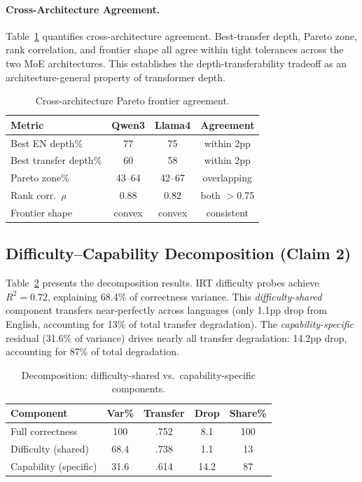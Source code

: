 \documentclass[11pt,a4paper]{article}
\begin{document}
\paragraph{Cross-Architecture Agreement.}
Table~\ref{tab:cross_arch} quantifies cross-architecture agreement. Best-transfer depth, Pareto zone, rank correlation, and frontier shape all agree within tight tolerances across the two MoE architectures. This establishes the depth-transferability tradeoff as an architecture-general property of transformer depth.

\begin{table}[t]
\centering
\small
\caption{Cross-architecture Pareto frontier agreement.}
\label{tab:cross_arch}
\begin{tabular}{lccc}
\toprule
Metric & Qwen3 & Llama4 & Agreement \\
\midrule
Best EN depth\% & 77 & 75 & within 2pp \\
Best transfer depth\% & 60 & 58 & within 2pp \\
Pareto zone\% & 43--64 & 42--67 & overlapping \\
Rank corr.\ $\rho$ & 0.88 & 0.82 & both $>$0.75 \\
Frontier shape & convex & convex & consistent \\
\bottomrule
\end{tabular}
\end{table}

\subsection{Difficulty--Capability Decomposition (Claim 2)}
\label{sec:res_decomp}

Table~\ref{tab:decomp} presents the decomposition results. IRT difficulty probes achieve $R^2=0.72$, explaining 68.4\% of correctness variance. This \emph{difficulty-shared} component transfers near-perfectly across languages (only 1.1pp drop from English, accounting for 13\% of total transfer degradation). The \emph{capability-specific} residual (31.6\% of variance) drives nearly all transfer degradation: 14.2pp drop, accounting for 87\% of total degradation.

\begin{table}[t]
\centering
\small
\caption{Decomposition: difficulty-shared vs.\ capability-specific components.}
\label{tab:decomp}
\begin{tabular}{lcccc}
\toprule
Component & Var\% & Transfer & Drop & Share\% \\
\midrule
Full correctness & 100 & .752 & 8.1 & 100 \\
Difficulty (shared) & 68.4 & .738 & 1.1 & 13 \\
Capability (specific) & 31.6 & .614 & 14.2 & 87 \\
\bottomrule
\end{tabular}
\end{table}
\end{document}
